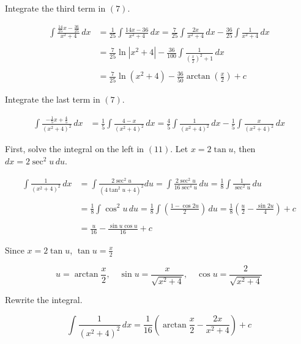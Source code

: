 \documentclass{article}
\begin{document}
\hfill

\noindent Integrate the third term in $(7)$.

\begin{align}\int\frac{\frac{14}{25}x-\frac{36}{25}}{x^2+4}\,dx&=\frac1{25}\int\frac{14x-36}{x^2+4}\,dx=\frac{7}{25}\int\frac{2x}{x^2+4}\,dx-\frac{36}{25}\int\frac1{x^2+4}\,dx\nonumber\\\nonumber\\&=\frac7{25}\ln\left|x^2+4\right|-\frac{36}{100}\int\frac1{\left(\frac x2\right)^2+1}\,dx\nonumber\\\nonumber\\&=\frac7{25}\ln\left(x^2+4\right)-\frac{36}{50}\arctan\left(\frac x2\right)+c\end{align}

\newpage

\noindent Integrate the last term in $(7)$.

\begin{align}\int\frac{-\frac15x+\frac45}{\left(x^2+4\right)^2}\,dx&=\frac15\int\frac{4-x}{\left(x^2+4\right)^2}\,dx=\frac45\int\frac1{\left(x^2+4\right)^2}\,dx-\frac15\int\frac x{\left(x^2+4\right)^2}\,dx\end{align}

\hfill

\noindent First, solve the integral on the left in $(11)$. Let $x=2\tan u$, then $dx=2\sec^2u\,du$.

\begin{align*}\int\frac1{\left(x^2+4\right)^2}\,dx&=\int\frac{2\sec^2u}{\left(4\tan^2u+4\right)^2}du=\int\frac{2\sec^2u}{16\sec^4u}\,du=\frac18\int\frac1{\sec^2u}\,du\\\\&=\frac18\int\cos^2u\,du=\frac18\int\left(\frac{1-\cos2u}2\right)\,du=\frac18\left(\frac u2-\frac{\sin2u}4\right)+c\\\\&=\frac u{16}-\frac{\sin u\cos u}{16}+c\end{align*}

\hfill

\noindent Since $x=2\tan u$, $\displaystyle\tan u=\frac x2$

\[u=\arctan \frac x2,\quad \sin u=\frac x{\sqrt{x^2+4}},\quad\cos u=\frac 2{\sqrt{x^2+4}}\]

\hfill

\noindent Rewrite the integral.

\begin{equation}\int\frac1{\left(x^2+4\right)^2}\,dx=\frac1{16}\left(\arctan \frac x2-\frac {2x}{x^2+4}\right)+c\end{equation}
\end{document}
